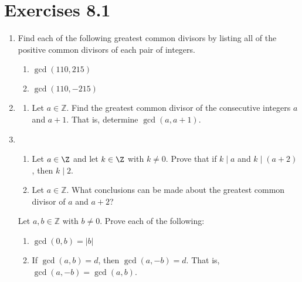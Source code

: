 \section*{Exercises 8.1}
%
\begin{enumerate}
\item Find each of the following greatest common divisors by listing all of the positive common  divisors of each pair of integers. \label{exer:sec81-1}

\begin{multicols}{3} 
\begin{enumerate}
\yitem $\gcd( {21, 28} )$
\yitem $\gcd( { - 21, 28} )$
\yitem $\gcd( {58, 63} )$
\yitem $\gcd( {0, 12} )$
\item $\gcd( {110, 215} )$
\item $\gcd( {110,  - 215} )$
\end{enumerate}
\end{multicols}

\item \label{exer:sec81-2} \begin{enumerate} \yitem Let  $a \in \Z$ and let  $k \in \Z$ with 
$k \ne 0$.  Prove that if  $k \mid a$ and  $k \mid \left( {a + 1} \right)$, then  $k \mid 1$, and hence  $k = \pm 1$. 

  \item Let  $a \in \mathbb{Z}$.  Find the greatest common divisor of the consecutive integers  $a$  and  $a + 1$.  That is, determine  $\gcd( {a, a + 1} )$.
\end{enumerate}

\item \begin{enumerate} \item Let  $a \in \Z$ and let  $k \in \Z$ with $k \ne 0$.  Prove that if  $k \mid a$ and  $k \mid \left( {a + 2} \right)$, then  $k \mid 2$.

  \item Let  $a \in \mathbb{Z}$.  What conclusions can be made about the greatest common divisor of  $a$  and  $a + 2$?  
\end{enumerate}

\xitem Let  $a, b \in \mathbb{Z}$ with  $b \ne 0$.  Prove each of the following:
\label{exer:sec81-props}

\begin{enumerate}
\item $\gcd( {0, b} ) = \left| b \right|$

\item If  $\gcd( {a, b} ) = d$, then  $\gcd( {a,  - b} ) = d$.  
That is, \\
$\gcd \left( {a,  - b} \right) = \gcd( {a, b} )$.
\end{enumerate}



\end{enumerate}
